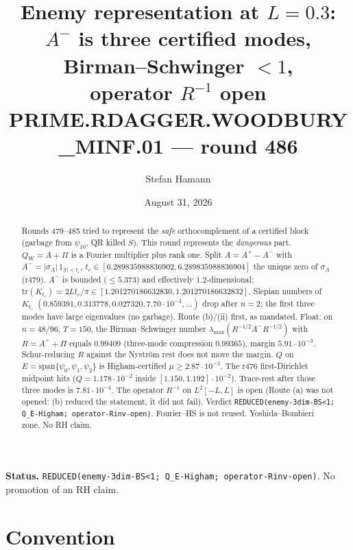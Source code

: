 \documentclass[11pt]{article}
\title{\bfseries Enemy representation at $L=0.3$:\\[2mm]
$A^-$ is three certified modes, Birman--Schwinger $<1$,\\[1mm]
operator $R^{-1}$ open\\[2mm]
\large PRIME.RDAGGER.WOODBURY\_MINF.01 --- round 486}
\author{Stefan Hamann}
\date{August 31, 2026}
\theoremstyle{remark}
\newcommand{\QW}{Q_{\mathrm W}}
\begin{document}
\maketitle

\begin{abstract}\noindent
Rounds 479--485 tried to represent the
\emph{safe} orthocomplement of a certified block
(garbage from $\psi_{10}$, QR killed $S$).
This round represents the \emph{dangerous} part.
$\QW=A+\Pi$ is a Fourier multiplier plus rank one.
Split $A=A^+-A^-$ with
$A^-=|\sigma_A|\,1_{|t|<t_c}$,
$t_c\in[6.289835988836902,6.289835988836904]$
the unique zero of $\sigma_A$ (r479).
$A^-$ is bounded ($\le5.373$) and effectively
$1.2$-dimensional:
$\mathrm{tr}(K_{t_c})=2Lt_c/\pi\in[1.201270186632830,1.201270186632832]$.
Slepian numbers of $K_{t_c}$
$(0.859391,0.313778,0.027320,7.70\cdot10^{-4},\dots)$
drop after $n=2$; the first three modes have large
eigenvalues (no garbage).
Route (b)/(ii) first, as mandated.
Float: on $n=48/96$, $T=150$,
the Birman--Schwinger number
$\lambda_{\max}(R^{-1/2}A^-R^{-1/2})$
with $R=A^++\Pi$ equals $0.99409$
(three-mode compression $0.99365$),
margin $5.91\cdot10^{-3}$.
Schur-reducing $R$ against the Nystr\"om rest
does not move the margin.
$Q$ on $E=\mathrm{span}\{\psi_0,\psi_1,\psi_2\}$
is Higham-certified
$\mu\ge2.87\cdot10^{-3}$.
The r476 first-Dirichlet midpoint hits
($Q=1.178\cdot10^{-2}$ inside
$[1.150,1.192]\cdot10^{-2}$).
Trace-rest after those three modes is
$7.81\cdot10^{-4}$.
The operator $R^{-1}$ on $L^2[-L,L]$ is open
(Route (a) was not opened: (b) reduced the
statement, it did not fail).
Verdict
\texttt{REDUCED(enemy-3dim-BS<1; Q\_E-Higham; operator-Rinv-open)}.
Fourier--HS is not reused.
Yoshida--Bombieri zone.  No RH claim.
\end{abstract}

\medskip\noindent
\textbf{Status.}\enspace
\texttt{REDUCED(enemy-3dim-BS<1; Q\_E-Higham; operator-Rinv-open)}.
No promotion of an RH claim.

\begin{center}
\end{center}

\section{Convention}
\end{document}
